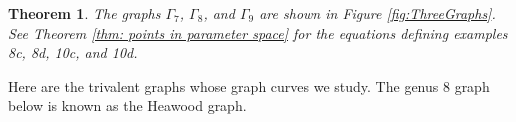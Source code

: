\documentclass{amsart}[12pt]
\newtheorem{theorem}{Theorem}[section]
\theoremstyle{definition}
\numberwithin{equation}{section}
\begin{document}
\begin{theorem}
The graphs $\Gamma_7$, $\Gamma_8$, and $\Gamma_9$ are shown in  Figure
\ref{fig:ThreeGraphs}. See Theorem \ref{thm: points in parameter
  space} for the equations defining examples 8c, 8d, 10c, and 10d.   

\end{theorem}


Here are the trivalent graphs whose graph curves we study. The genus 8
graph below is known as the Heawood graph. %
\end{document}
